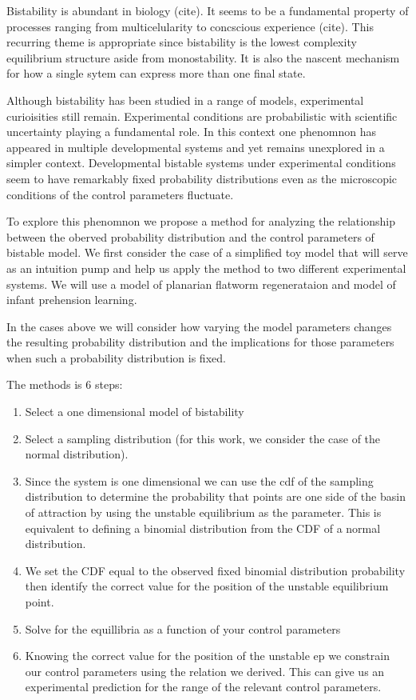 \documentclass[12pt, a4paper]{article}
\begin{document}
Bistability is abundant in biology (cite). It seems to 
be a fundamental property of processes ranging from multicelularity 
to concscious experience (cite). This recurring theme is appropriate since
bistability is the lowest complexity equilibrium structure aside
from monostability. It is also the nascent mechanism for how a single
sytem can express more than one final state. 

Although bistability has been studied in a range of models, experimental
curioisities still remain. Experimental conditions are probabilistic
with scientific uncertainty playing a fundamental role. In this context
one phenomnon has appeared in multiple developmental systems
and yet remains unexplored in a simpler context. Developmental bistable systems
under experimental conditions seem to have remarkably fixed probability
distributions even as the microscopic conditions of the control
parameters fluctuate.

To explore this phenomnon we propose a method for analyzing the 
relationship between the oberved probability distribution and the control
parameters of bistable model. We first consider the case of a simplified
toy model that will serve as an intuition pump and help us apply the method
to two different experimental systems. We will use a 
model of planarian flatworm regenerataion and model of infant 
prehension learning.

In the cases above we will consider how varying the model parameters
changes the resulting probability distribution and the implications for
those parameters when such a probability distribution is fixed. 

The methods is 6 steps:
\begin{enumerate}
    \item Select a one dimensional model of bistability
    \item Select a sampling distribution (for this work, we consider 
        the case of the normal distribution).
    \item Since the system is one dimensional we can use the cdf of the sampling
        distribution to determine the probability that points are one side
        of the basin of attraction by using the unstable equilibrium as 
        the parameter. This is equivalent to defining a binomial distribution
        from the CDF of a normal distribution.
    \item We set the CDF equal to the observed fixed binomial distribution
        probability
        then identify the correct value for the position of the
        unstable equilibrium point.
    \item Solve for the equillibria as a function of your control parameters
    \item Knowing the correct value for the position of the unstable ep we
        constrain our control parameters using the relation we derived.
        This can give us an experimental prediction for the range of the 
        relevant control parameters.

\end{enumerate}
\end{document}
